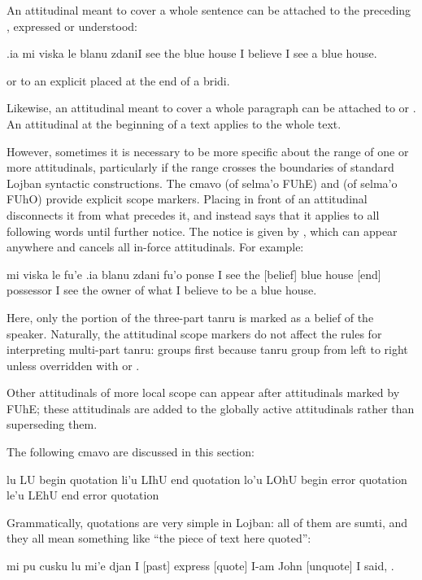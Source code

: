 An attitudinal meant to cover a whole sentence can be
    attached to the preceding , expressed or understood:
\begin{example}
[.i] .ia mi viska le blanu zdani\n
[belief] I see the blue house\n
I believe I see a blue house.
\end{example}

{\noindent}or to an explicit  placed at the end of a bridi. 

Likewise, an attitudinal meant to cover a whole paragraph
    can be attached to  or . An attitudinal at the
    beginning of a text applies to the whole text.

However, sometimes it is necessary to be more specific about
    the range of one or more attitudinals, particularly if the
    range crosses the boundaries of standard Lojban syntactic
    constructions. The cmavo  (of selma'o FUhE) and
     (of selma'o FUhO) provide explicit scope markers.
    Placing  in front of an attitudinal disconnects it from
    what precedes it, and instead says that it applies to all
    following words until further notice. The notice is given by
    , which can appear anywhere and cancels all in-force
    attitudinals. For example:
\begin{example}
mi viska le fu'e .ia blanu zdani fu'o ponse\n
I see the  [belief] blue house [end] possessor\n
I see the owner of what I believe to be a blue house.
\end{example}

Here, only the  portion of the three-part
    tanru  is marked as a belief of the
    speaker. Naturally, the attitudinal scope markers do not affect
    the rules for interpreting multi-part tanru: 
    groups first because tanru group from left to right unless
    overridden with  or .

Other attitudinals of more local scope can appear after
    attitudinals marked by FUhE; these attitudinals are added to
    the globally active attitudinals rather than superseding
    them.



The following cmavo are discussed in this section:

   lu  LU  begin quotation
    li'u    LIhU    end quotation
    lo'u    LOhU    begin error quotation
    le'u    LEhU    end error quotation

Grammatically, quotations are very simple in Lojban: all of
    them are sumti, and they all mean something like ``the piece of
    text here quoted'':
\begin{example}
mi pu cusku lu mi'e djan \n
I [past] express [quote] I-am John [unquote]\n
I said, .
\end{example}

